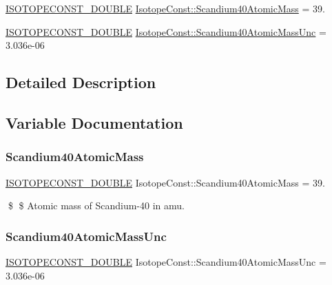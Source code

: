 \begin{DoxyCompactItemize}
\item 
\mbox{\hyperlink{group___isotope_const-_macros_ga8f45a7272ce02c0b4c65c44636ed719a}{I\+S\+O\+T\+O\+P\+E\+C\+O\+N\+S\+T\+\_\+\+D\+O\+U\+B\+LE}} \mbox{\hyperlink{group___isotope_const-_scandium-_sc40_ga1189f123a0af72575a9417c4818ba0f8}{Isotope\+Const\+::\+Scandium40\+Atomic\+Mass}} = 39.
\item 
\mbox{\hyperlink{group___isotope_const-_macros_ga8f45a7272ce02c0b4c65c44636ed719a}{I\+S\+O\+T\+O\+P\+E\+C\+O\+N\+S\+T\+\_\+\+D\+O\+U\+B\+LE}} \mbox{\hyperlink{group___isotope_const-_scandium-_sc40_gaa0dd2fcec2c92ff2141e77686ac3b0b3}{Isotope\+Const\+::\+Scandium40\+Atomic\+Mass\+Unc}} = 3.\+036e-\/06
\end{DoxyCompactItemize}


\subsection{Detailed Description}


\subsection{Variable Documentation}
\mbox{\label{group___isotope_const-_scandium-_sc40_ga1189f123a0af72575a9417c4818ba0f8}} 
\subsubsection{\texorpdfstring{Scandium40\+Atomic\+Mass}{Scandium40AtomicMass}}
{\footnotesize\ttfamily \mbox{\hyperlink{group___isotope_const-_macros_ga8f45a7272ce02c0b4c65c44636ed719a}{I\+S\+O\+T\+O\+P\+E\+C\+O\+N\+S\+T\+\_\+\+D\+O\+U\+B\+LE}} Isotope\+Const\+::\+Scandium40\+Atomic\+Mass = 39.}

\$ \$ Atomic mass of Scandium-\/40 in amu. \mbox{\label{group___isotope_const-_scandium-_sc40_gaa0dd2fcec2c92ff2141e77686ac3b0b3}} 
\subsubsection{\texorpdfstring{Scandium40\+Atomic\+Mass\+Unc}{Scandium40AtomicMassUnc}}
{\footnotesize\ttfamily \mbox{\hyperlink{group___isotope_const-_macros_ga8f45a7272ce02c0b4c65c44636ed719a}{I\+S\+O\+T\+O\+P\+E\+C\+O\+N\+S\+T\+\_\+\+D\+O\+U\+B\+LE}} Isotope\+Const\+::\+Scandium40\+Atomic\+Mass\+Unc = 3.\+036e-\/06}

